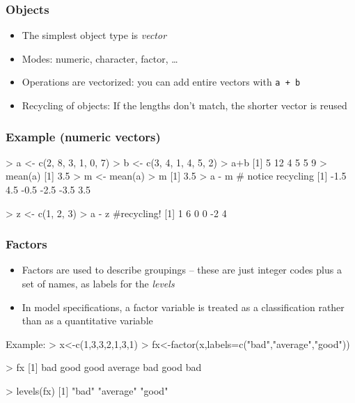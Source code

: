 \documentclass{beamer}
\newcommand{\code}[1]{\texttt{#1}}
\let\overbatim\verbatim
\let\endoverbatim\endverbatim
\newenvironment{vcode}%
{\bgroup\baselineskip=0.8\baselineskip\overbatim}%
{\endoverbatim\egroup}
\begin{document}
\begin{frame}
  \frametitle{Objects}
  \begin{itemize}
  \item The simplest object type is \emph{vector}
  \item Modes: numeric,  character,  factor, \ldots
  \item Operations are vectorized: you can add entire vectors with
    \code{a + b}
  \item Recycling of objects: If the lengths don't match, the shorter
    vector is reused 
  \end{itemize}
\end{frame}


\begin{frame}[fragile]
\frametitle{Example (numeric vectors)}
\begin{vcode}
> a <- c(2, 8, 3, 1, 0, 7)
> b <- c(3, 4, 1, 4, 5, 2)
> a+b
[1]  5 12  4  5  5  9
> mean(a)
[1] 3.5
> m <- mean(a)
> m
[1] 3.5
> a - m # notice recycling
[1] -1.5  4.5 -0.5 -2.5 -3.5  3.5

> z <- c(1, 2, 3)
> a - z   #recycling!
[1]  1  6  0  0 -2  4
\end{vcode}
\end{frame}


\begin{frame}[fragile]
  \frametitle{Factors}
  \begin{itemize}
  \item \alert{Factors} are used to describe groupings -- these are just integer codes plus a set of names, as labels for
    the \emph{levels}
  \item In model specifications, a factor variable is treated as a classification
    rather than as a quantitative variable
  \end{itemize}
 Example: 
\begin{vcode}
> x<-c(1,3,3,2,1,3,1)
> fx<-factor(x,labels=c("bad","average","good"))

> fx
[1] bad     good    good    average bad     good    bad    

 > levels(fx)
[1] "bad"     "average" "good"       
\end{vcode}     
\end{frame}
\end{document}
